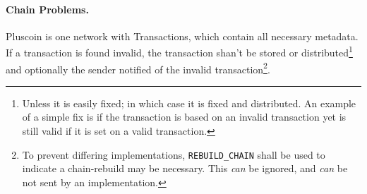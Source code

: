 \documentclass{article}
\begin{document}
\paragraph{Chain Problems.} Pluscoin is one network with Transactions,
which contain all necessary metadata. If a transaction is found invalid, the
transaction shan't be stored or distributed\footnote{Unless it is easily fixed;
in which case it is fixed and distributed. An example of a simple fix is if the
transaction is based on an invalid transaction yet is still valid if it is set
on a valid transaction.} and optionally the sender notified of the invalid
transaction\footnote {To prevent differing implementations,
\texttt{REBUILD\_CHAIN} shall be used to indicate a chain-rebuild may be
necessary. This {\it{can}} be ignored, and {\it{can}} be not sent by an
implementation.}.
\end{document}
